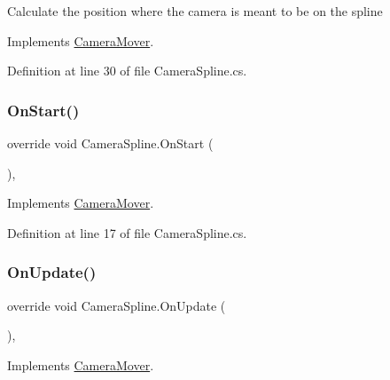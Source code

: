 Calculate the position where the camera is meant to be on the spline 



Implements \mbox{\hyperlink{class_camera_mover_afe44c2188d44a3fdb72acdf0d12563a9}{Camera\+Mover}}.



Definition at line 30 of file Camera\+Spline.\+cs.

\mbox{\label{class_camera_spline_a8c3df3fb0d0ba26126d97432331a209b}} 
\subsubsection{\texorpdfstring{On\+Start()}{OnStart()}}
{\footnotesize\ttfamily override void Camera\+Spline.\+On\+Start (\begin{DoxyParamCaption}{ }\end{DoxyParamCaption})\hspace{0.3cm}{\ttfamily [protected]}, {\ttfamily [virtual]}}



Implements \mbox{\hyperlink{class_camera_mover_ab96169179c915b4c8599c956dc572fc7}{Camera\+Mover}}.



Definition at line 17 of file Camera\+Spline.\+cs.

\mbox{\label{class_camera_spline_a52812811103b9fca941daf2edd3c763d}} 
\subsubsection{\texorpdfstring{On\+Update()}{OnUpdate()}}
{\footnotesize\ttfamily override void Camera\+Spline.\+On\+Update (\begin{DoxyParamCaption}{ }\end{DoxyParamCaption})\hspace{0.3cm}{\ttfamily [protected]}, {\ttfamily [virtual]}}



Implements \mbox{\hyperlink{class_camera_mover_add4a882d9c8684a75d9d2cdacf90a74f}{Camera\+Mover}}.



